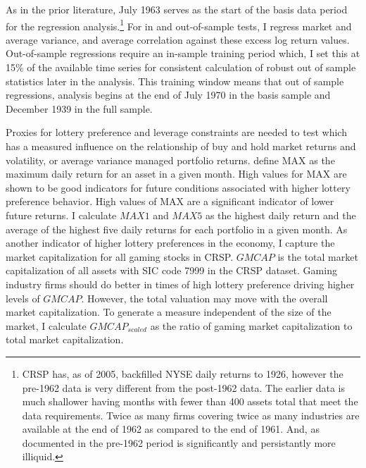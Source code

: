 As in the prior literature, July 1963 serves as the start of the basis data period for the regression analysis.\footnote{CRSP has, as of 2005, backfilled NYSE daily returns to 1926, however the pre-1962 data is very different from the post-1962 data. The earlier data is much shallower having months with fewer than 400 assets total that meet the data requirements. Twice as many firms covering twice as many industries are available at the end of 1962 as compared to the end of 1961. And, as documented in \citet{jones_century_2002} the pre-1962 period is significantly and persistantly more illiquid.} For in and out-of-sample tests, I regress market and average variance, and average correlation against these excess log return values. Out-of-sample regressions require an in-sample training period which, I set this at 15\% of the available time series for consistent calculation of robust out of sample statistics later in the analysis. This training window means that out of sample regressions, analysis begins at the end of July 1970 in the basis sample and December 1939 in the
full sample.

Proxies for lottery preference and leverage constraints are needed to test which has a measured influence on the relationship of buy and hold market returns and volatility, or average variance managed portfolio returns. \citet{bali_maxing_2011} define MAX as the maximum daily return for an asset in a given month. High values for MAX are shown to be good indicators for future conditions associated with higher lottery preference behavior. High values of MAX are a significant indicator of lower future returns. I calculate $MAX1$ and $MAX5$ as the highest daily return and the average of the highest five daily returns for each portfolio in a given month. As another indicator of higher lottery preferences in the economy, I capture the market capitalization for all gaming stocks in CRSP. $GMCAP$ is the total market capitalization of all assets with SIC code 7999 in the CRSP dataset. Gaming industry firms should do better in times of high lottery preference driving higher levels of $GMCAP$. However, the total valuation may move with the overall market capitalization. To generate a measure independent of the size of the market, I calculate $GMCAP_{scaled}$ as the ratio of gaming market capitalization to total market capitalization.

